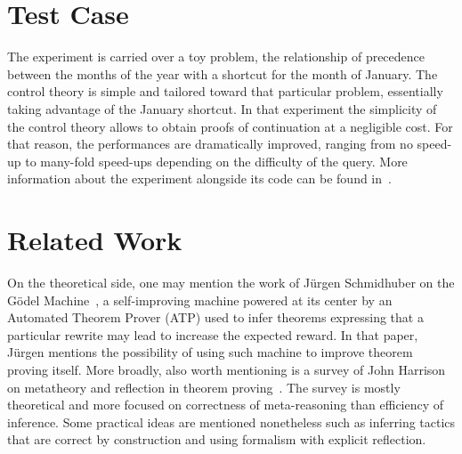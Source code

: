 \documentclass{easychair}
\begin{document}
\section{Test Case}

The experiment is carried over a toy problem, the relationship of
precedence between the months of the year with a shortcut for the
month of January.  The control theory is simple and tailored toward
that particular problem, essentially taking advantage of the January
shortcut.
In that experiment the simplicity of the control theory allows to
obtain proofs of continuation at a negligible cost.  For that reason,
the performances are dramatically improved, ranging from no speed-up
to many-fold speed-ups depending on the difficulty of the query.  More
information about the experiment alongside its code can be found
in~\cite{Geisweiller2024ICM}.






\section{Related Work}

On the theoretical side, one may mention the work of J\"urgen
Schmidhuber on the G\"odel Machine~\cite{Schmidhuber2003}, a
self-improving machine powered at its center by an Automated Theorem
Prover (ATP) used to infer theorems expressing that a particular
rewrite may lead to increase the expected reward.  In that paper,
J\"urgen mentions the possibility of using such machine to improve
theorem proving itself.  More broadly, also worth mentioning is a
survey of John Harrison on metatheory and reflection in theorem
proving~\cite{Harrison1995MetatheoryAR}.  The survey is mostly
theoretical and more focused on correctness of meta-reasoning than
efficiency of inference.  Some practical ideas are mentioned
nonetheless such as inferring tactics that are correct by construction
and using formalism with explicit reflection.
\end{document}
